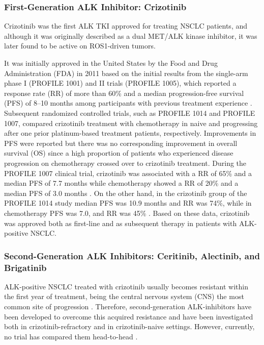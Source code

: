 \subsubsection{First-Generation ALK Inhibitor: Crizotinib}

Crizotinib was the first ALK TKI approved for treating NSCLC patients, and although it was originally described as a dual MET\slash ALK kinase inhibitor, it was later found to be active on ROS1-driven tumors.

It was initially approved in the United States by the Food and Drug Administration (FDA) in 2011 based on the initial results from the single-arm phase I (PROFILE 1001) and II trials (PROFILE 1005), which reported a response rate (RR) of more than 60\% and a median progression-free survival (PFS) of 8–10 months among participants with previous treatment experience \cite{Crizotinib_1_2}. Subsequent randomized controlled trials, such as PROFILE 1014 and PROFILE 1007, compared crizotinib treatment with chemotherapy in naive and progressing after one prior platinum-based treatment patients, respectively. Improvements in PFS were reported but there was no corresponding improvement in overall survival (OS) since a high proportion of patients who experienced disease progression on chemotherapy crossed over to crizotinib treatment. During the PROFILE 1007 clinical trial, crizotinib was associated with a RR of 65\% and a median PFS of 7.7 months while chemotherapy showed a RR of 20\% and a median PFS of 3.0 months \cite{Crizo_chemo}. On the other hand, in the crizotinib group of the PROFILE 1014 study median PFS was 10.9 months and RR was 74\%, while in chemotherapy PFS was 7.0, and RR was 45\% \cite{NSCLC_therapies}. Based on these data, crizotinib was approved both as first-line and as subsequent therapy in patients with ALK-positive NSCLC.

\subsubsection{Second-Generation ALK Inhibitors: Ceritinib, Alectinib, and Brigatinib}

ALK-positive NSCLC treated with crizotinib usually becomes resistant within the first year of treatment, being the central nervous system (CNS) the most common site of progression \cite{NSCLC_drivers, NSCLC_therapies, ALK_resistance}. Therefore, second-generation ALK-inhibitors have been developed to overcome this acquired resistance and have been investigated both in crizotinib-refractory and in crizotinib-naive settings. However, currently, no trial has compared them head-to-head \cite{ALK_comparison}.

